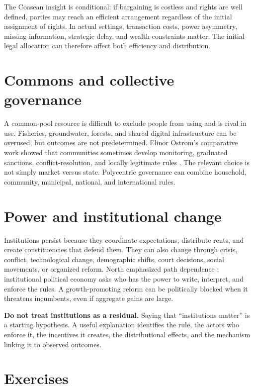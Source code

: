 \documentclass[11pt,oneside,openany]{book}
\begin{document}
The Coasean insight is conditional: if bargaining is costless and rights are well defined, parties may reach an efficient arrangement regardless of the initial assignment of rights. In actual settings, transaction costs, power asymmetry, missing information, strategic delay, and wealth constraints matter. The initial legal allocation can therefore affect both efficiency and distribution.

\section{Commons and collective governance}

A common-pool resource is difficult to exclude people from using and is rival in use. Fisheries, groundwater, forests, and shared digital infrastructure can be overused, but outcomes are not predetermined. Elinor Ostrom's comparative work showed that communities sometimes develop monitoring, graduated sanctions, conflict-resolution, and locally legitimate rules \cite{ostrom1990,ostrom2010}. The relevant choice is not simply market versus state. Polycentric governance can combine household, community, municipal, national, and international rules.

\section{Power and institutional change}

Institutions persist because they coordinate expectations, distribute rents, and create constituencies that defend them. They can also change through crisis, conflict, technological change, demographic shifts, court decisions, social movements, or organized reform. North emphasized path dependence \cite{north1990}; institutional political economy asks who has the power to write, interpret, and enforce the rules. A growth-promoting reform can be politically blocked when it threatens incumbents, even if aggregate gains are large.

\begin{warningbox}
\textbf{Do not treat institutions as a residual.} Saying that ``institutions matter'' is a starting hypothesis. A useful explanation identifies the rule, the actors who enforce it, the incentives it creates, the distributional effects, and the mechanism linking it to observed outcomes.
\end{warningbox}

\section{Exercises}
\end{document}
